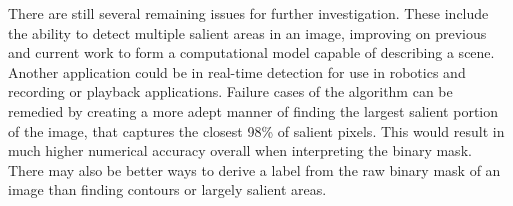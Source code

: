 \documentclass[10pt,twocolumn,letterpaper]{article}
\begin{document}
There are still several remaining issues for further investigation.  These include the ability to detect multiple salient areas in an image, improving on previous and current work to form a computational model capable of describing a scene.  Another application could be in real-time detection for use in robotics and recording or playback applications.  Failure cases of the algorithm can be remedied by creating a more adept manner of finding the largest salient portion of the image, that captures the closest 98\% of salient pixels.  This would result in much higher numerical accuracy overall when interpreting the binary mask.  There may also be better ways to derive a label from the raw binary mask of an image than finding contours or largely salient areas.






%
%
%
%
%
%
%
%
\end{document}
